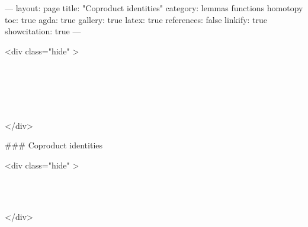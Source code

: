 ---
layout: page
title: "Coproduct identities"
category: lemmas functions homotopy
toc: true
agda: true
gallery: true
latex: true
references: false
linkify: true
showcitation: true
---

<div class="hide" >
\begin{code}%
\>[0]\AgdaSymbol{\{-\#}\AgdaSpace{}%
\AgdaSpace{}%
\AgdaSpace{}%
\AgdaSymbol{\#-\}}\<%
\\
\>[0]\AgdaSpace{}%
\AgdaSpace{}%
\<%
\\
\>[0]\AgdaSpace{}%
\AgdaSpace{}%
\<%
\\
\>[0]\AgdaSpace{}%
\AgdaSpace{}%
\<%
\\
\>[0]\AgdaSpace{}%
\AgdaSpace{}%
\<%
\end{code}
</div>

### Coproduct identities

<div class="hide" >
\begin{code}%
\>[0]\<%
\\
\>[0][@{}l@{\AgdaIndent{0}}]%
\>[2]\<%
\\
%
\>[2]\<%
\end{code}
</div>

